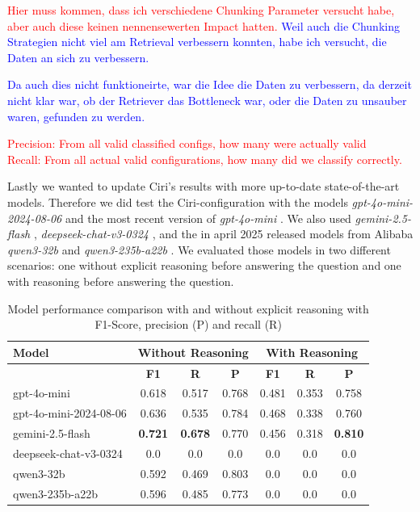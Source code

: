 \textcolor{red}{Hier muss kommen, dass ich verschiedene Chunking Parameter versucht habe, aber auch diese keinen nennensewerten Impact hatten.}
\textcolor{blue}{Weil auch die Chunking Strategien nicht viel am Retrieval verbessern konnten, habe ich versucht, die Daten an sich zu verbessern.}


\textcolor{blue}{Da auch dies nicht funktioneirte, war die Idee die Daten zu verbessern, da derzeit nicht klar war, ob der Retriever das Bottleneck war, oder die Daten zu unsauber waren, gefunden zu werden.}


\textcolor{red}{Precision: From all valid classified configs, how many were actually valid\\Recall: From all actual valid configurations, how many did we classify correctly.}

Lastly we wanted to update Ciri's results with more up-to-date state-of-the-art models. Therefore we did test the Ciri-configuration with the models \textit{gpt-4o-mini-2024-08-06} and the most recent version of \textit{gpt-4o-mini} \cite{OpenAI_2022}. We also used \textit{gemini-2.5-flash} \cite{gemini-2.0}, \textit{deepseek-chat-v3-0324} \cite{deepseekai2024deepseekv3technicalreport}, and the in april 2025 released models from Alibaba \textit{qwen3-32b} and \textit{qwen3-235b-a22b} \cite{qwen3}. We evaluated those models in two different scenarios: one without explicit reasoning before answering the question and one with reasoning before answering the question. 


\begin{table}[h]
    \centering
    \begin{tabular}{|l|c|c|c|c|c|c|}
        \hline
        \textbf{Model} & \multicolumn{3}{c|}{\textbf{Without Reasoning}} & \multicolumn{3}{c|}{\textbf{With Reasoning}} \\
        \hline
        & \textbf{F1} & \textbf{R} & \textbf{P} & \textbf{F1} & \textbf{R} & \textbf{P} \\
        \hline
        gpt-4o-mini & 0.618 & 0.517 & 0.768 & 0.481 & 0.353 & 0.758 \\
        gpt-4o-mini-2024-08-06 & 0.636 & 0.535 & 0.784 & 0.468 & 0.338 & 0.760 \\
        gemini-2.5-flash & \textbf{0.721} & \textbf{0.678} & 0.770 & 0.456 & 0.318 & \textbf{0.810} \\
        deepseek-chat-v3-0324 & 0.0 & 0.0 & 0.0 & 0.0 & 0.0 & 0.0 \\
        qwen3-32b & 0.592 & 0.469 & 0.803 & 0.0 & 0.0 & 0.0 \\
        qwen3-235b-a22b & 0.596 & 0.485 & 0.773 & 0.0 & 0.0 & 0.0 \\
        \hline
    \end{tabular}
    \caption{Model performance comparison with and without explicit reasoning with F1-Score, precision (P) and recall (R)}
    \label{tab:model_comparison}
\end{table}

